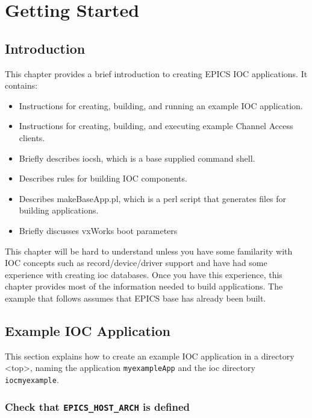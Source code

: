 \chapter{Getting Started}

\section{Introduction}

This chapter provides a brief introduction to creating EPICS IOC applications. It contains:

\begin{itemize}\item Instructions for creating, building, and running an example IOC application.

\item Instructions for creating, building, and executing example Channel Access clients.

\item Briefly describes iocsh, which is a base supplied command shell.

\item Describes rules for building IOC components.

\item Describes makeBaseApp.pl, which is a perl script that generates files for building applications.

\item Briefly discusses vxWorks boot parameters

\end{itemize}This chapter will be hard to understand unless you have some familarity with IOC concepts such as record/device/driver 
support and have had some experience with creating ioc databases. Once you have this experience, this chapter provides 
most of the information needed to build applications. The example that follows assumes that EPICS base has already been 
built.

\section{Example IOC Application}

This section explains how to create an example IOC application in a directory \textless{}top\textgreater{}, naming the application 
\verb|myexampleApp| and the ioc directory \verb|iocmyexample|.

\subsection{Check that \texttt{EPICS\_HOST\_ARCH} is defined}

